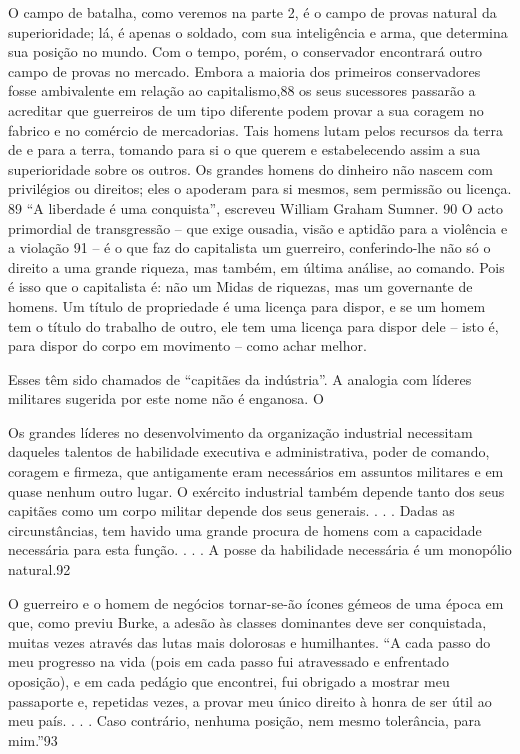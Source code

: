  \par 
O campo de batalha, como veremos na parte 2, é o campo de provas natural da superioridade; lá, é apenas o soldado, com sua inteligência e arma, que determina sua posição no mundo. Com o tempo, porém, o conservador encontrará outro campo de provas no mercado. Embora a maioria dos primeiros conservadores fosse ambivalente em relação ao capitalismo,88 os seus sucessores passarão a acreditar que guerreiros de um tipo diferente podem provar a sua coragem no fabrico e no comércio de mercadorias. Tais homens lutam pelos recursos da terra de e para a terra, tomando para si o que querem e estabelecendo assim a sua superioridade sobre os outros. Os grandes homens do dinheiro não nascem com privilégios ou direitos; eles o apoderam para si mesmos, sem permissão ou licença. {\color{blue}89} “A liberdade é uma conquista”, escreveu William Graham Sumner. {\color{blue}90} O acto primordial de transgressão – que exige ousadia, visão e aptidão para a violência e a violação {\color{blue}91} – é o que faz do capitalista um guerreiro, conferindo-lhe não só o direito a uma grande riqueza, mas também, em última análise, ao comando. Pois é isso que o capitalista é: não um Midas de riquezas, mas um governante de homens. Um título de propriedade é uma licença para dispor, e se um homem tem o título do trabalho de outro, ele tem uma licença para dispor dele – isto é, para dispor do corpo em movimento – como achar melhor.
 \par 
Esses têm sido chamados de “capitães da indústria”. A analogia com líderes militares sugerida por este nome não é enganosa. O
 \par 
Os grandes líderes no desenvolvimento da organização industrial necessitam daqueles talentos de habilidade executiva e administrativa, poder de comando, coragem e firmeza, que antigamente eram necessários em assuntos militares e em quase nenhum outro lugar. O exército industrial também depende tanto dos seus capitães como um corpo militar depende dos seus generais. . . . Dadas as circunstâncias, tem havido uma grande procura de homens com a capacidade necessária para esta função. . . . A posse da habilidade necessária é um monopólio natural.{\color{blue}92}
 \par 
O guerreiro e o homem de negócios tornar-se-ão ícones gémeos de uma época em que, como previu Burke, a adesão às classes dominantes deve ser conquistada, muitas vezes através das lutas mais dolorosas e humilhantes. “A cada passo do meu progresso na vida (pois em cada passo fui atravessado e enfrentado oposição), e em cada pedágio que encontrei, fui obrigado a mostrar meu passaporte e, repetidas vezes, a provar meu único direito à honra de ser útil ao meu país. . . . Caso contrário, nenhuma posição, nem mesmo tolerância, para mim.”{\color{blue}93}
